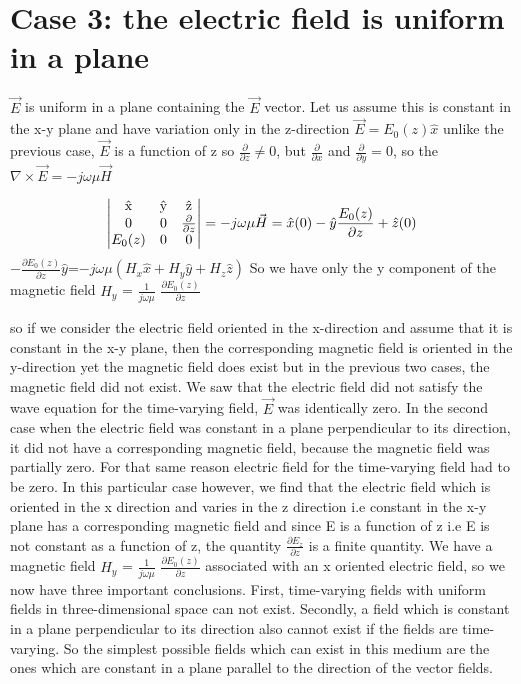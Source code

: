 \section{Case 3: the electric field is uniform in a plane}
$\vec{E}$ is uniform in a plane containing the $\vec{E}$ vector. Let us assume this is constant in the x-y plane and have variation only in the z-direction $\vec{E}=E_{0}(z)\hat{x}$ unlike the previous case, $\vec{E}$ is a function of z so $\frac{\partial}{\partial z}\neq0$, but $\frac{\partial}{\partial x}$ and $\frac{\partial}{\partial y}=0$, so the $\nabla\times\vec{E}=-j\omega\mu\vec{H}$

\begin{dmath*}
\begin{vmatrix}
$\^{x}$ & $\^{y}$ & $\^{z}$\\
0 & 0 & \pdv{}{z} \\
$$E_{0}(z)$$ & 0 & 0
\end{vmatrix}=-j\omega\mu\vec{H}=\hat{x}(0) - \hat{y}\frac{E_{0}(z)}{\partial z} + \hat{z}(0)
\end{dmath*}			
$-\frac{\partial E_{0}(z)}{\partial z}\hat{y}$=$-j\omega\mu(H_{x}\hat{x} + H_{y}\hat{y} + H_{z}\hat{z} )$
So we have only the y component of the magnetic field $H_{y}$ = $\frac{1}{j\omega\mu}$ $\frac{\partial E_{0}(z)}{\partial z}$

so if we consider the electric field oriented in the x-direction and assume that it is constant in the x-y plane, then the corresponding magnetic field is oriented in the y-direction yet the magnetic field does exist but in the previous two cases, the magnetic field did not exist. We saw that the electric field did not satisfy the wave equation for the time-varying field, $\vec{E}$ was identically zero. In the second case when the electric field was constant in a plane perpendicular to its direction, it did not have a corresponding magnetic field, because the magnetic field was partially zero. For that same reason electric field for the time-varying field had to be zero.   
In this particular case however, we find that the electric field which is oriented in the x direction and varies in the z direction i.e constant in the x-y plane has a corresponding magnetic field and since E is a function of z i.e E is not constant as a function of z, the quantity $\frac{\partial {E_z}}{\partial {z}}$ is a finite quantity. We have a magnetic field $H_{y}$ = $\frac{1}{j\omega\mu}$ $\frac{\partial E_{0}(z)}{\partial z}$ associated with an x oriented electric field, so we now have three important conclusions. First, time-varying fields with uniform fields in three-dimensional space can not exist. Secondly, a field which is constant in a plane perpendicular to its direction also cannot exist if the fields are time-varying. So the simplest possible fields which can exist in this medium are the ones which are constant in a plane parallel to the direction of the vector fields.

